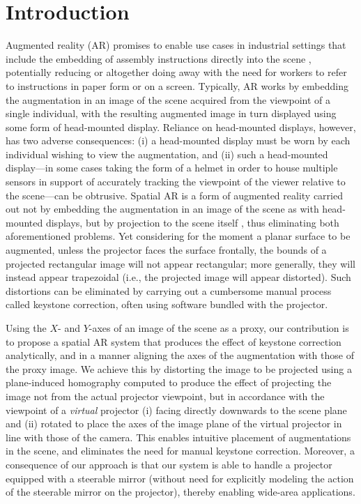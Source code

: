 \documentclass[review]{elsarticle}
\begin{document}
\linenumbers

\section{Introduction}\label{sec:intro}

Augmented reality (AR) \cite{van2010survey,zhou2008trends} promises to enable use cases in industrial settings that include the embedding of assembly instructions directly into the scene \cite{schlund2018moglichkeiten,masood2019augmented,gattullo2019towards}, potentially reducing or altogether doing away with the need for workers to refer to instructions in paper form or on a screen. Typically, AR works by embedding the augmentation in an image of the scene acquired from the viewpoint of a single individual, with the resulting augmented image in turn displayed using some form of head-mounted display. Reliance on head-mounted displays, however, has two adverse consequences: (i) a head-mounted display must be worn by each individual wishing to view the augmentation, and (ii) such a head-mounted display---in some cases taking the form of a helmet in order to house multiple sensors in support of accurately tracking the viewpoint of the viewer relative to the scene---can be obtrusive. Spatial AR is a form of augmented reality carried out not by embedding the augmentation in an image of the scene as with head-mounted displays, but by projection to the scene itself \cite{bimber2019spatial}, thus eliminating both aforementioned problems. Yet considering for the moment a planar surface to be augmented, unless the projector faces the surface frontally, the bounds of a projected rectangular image will not appear rectangular; more generally, they will instead appear trapezoidal (i.e., the projected image will appear distorted). Such distortions can be eliminated by carrying out a cumbersome manual process called keystone correction, often using software bundled with the projector.

Using the $X$- and $Y$-axes of an image of the scene as a proxy, our contribution is to propose a spatial AR system that produces the effect of keystone correction analytically, and in a manner aligning the axes of the augmentation with those of the proxy image. We achieve this by distorting the image to be projected using a plane-induced homography computed to produce the effect of projecting the image not from the actual projector viewpoint, but in accordance with the viewpoint of a \textit{virtual} projector (i) facing directly downwards to the scene plane and (ii) rotated to place the axes of the image plane of the virtual projector in line with those of the camera. This enables intuitive placement of augmentations in the scene, and eliminates the need for manual keystone correction. Moreover, a consequence of our approach is that our system is able to handle a projector equipped with a steerable mirror (without need for explicitly modeling the action of the steerable mirror on the projector), thereby enabling wide-area applications.
\end{document}
